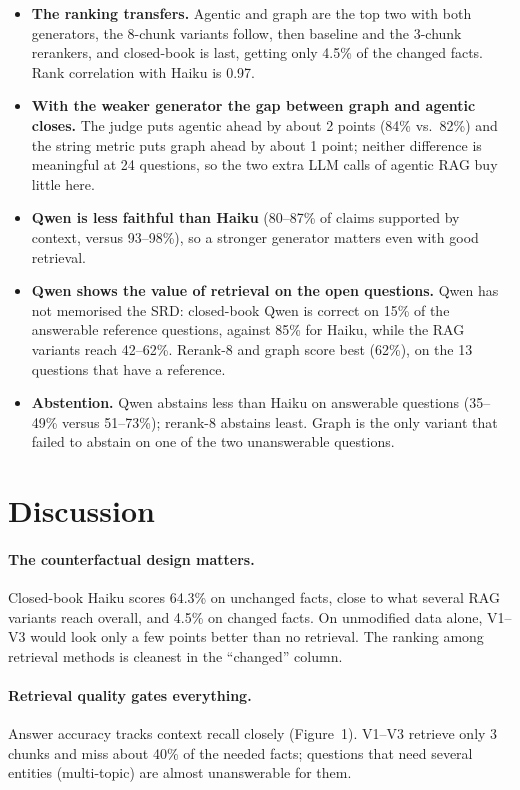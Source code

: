 \documentclass[11pt,a4paper]{article}
\begin{document}
\begin{itemize}
\item \textbf{The ranking transfers.} Agentic and graph are the top two with both generators, the 8-chunk variants follow, then baseline and the 3-chunk rerankers, and closed-book is last, getting only 4.5\% of the changed facts. Rank correlation with Haiku is 0.97.
\item \textbf{With the weaker generator the gap between graph and agentic closes.} The judge puts agentic ahead by about 2 points (84\% vs.\ 82\%) and the string metric puts graph ahead by about 1 point; neither difference is meaningful at 24 questions, so the two extra LLM calls of agentic RAG buy little here.
\item \textbf{Qwen is less faithful than Haiku} (80--87\% of claims supported by context, versus 93--98\%), so a stronger generator matters even with good retrieval.
\item \textbf{Qwen shows the value of retrieval on the open questions.} Qwen has not memorised the SRD: closed-book Qwen is correct on 15\% of the answerable reference questions, against 85\% for Haiku, while the RAG variants reach 42--62\%. Rerank-8 and graph score best (62\%), on the 13 questions that have a reference.
\item \textbf{Abstention.} Qwen abstains less than Haiku on answerable questions (35--49\% versus 51--73\%); rerank-8 abstains least. Graph is the only variant that failed to abstain on one of the two unanswerable questions.
\end{itemize}

\section{Discussion}
\paragraph{The counterfactual design matters.} Closed-book Haiku scores 64.3\% on unchanged facts, close to what several RAG variants reach overall, and 4.5\% on changed facts. On unmodified data alone, V1--V3 would look only a few points better than no retrieval. The ranking among retrieval methods is cleanest in the ``changed'' column.

\paragraph{Retrieval quality gates everything.} Answer accuracy tracks context recall closely (Figure~1). V1--V3 retrieve only 3 chunks and miss about 40\% of the needed facts; questions that need several entities (multi-topic) are almost unanswerable for them.
\end{document}

